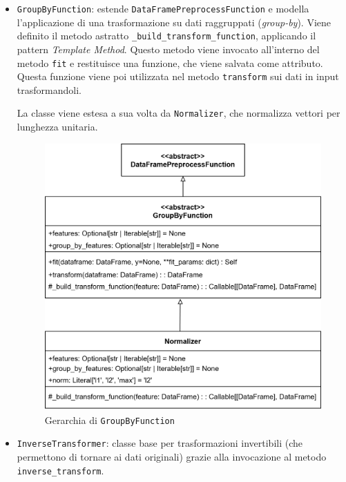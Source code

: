 \begin{itemize}
    \item \texttt{GroupByFunction}: estende \texttt{DataFramePreprocessFunction} e modella l'applicazione di una trasformazione su dati raggruppati (\textit{group-by}). Viene definito il metodo astratto \texttt{\_build\_transform\_function}, applicando il pattern \textit{Template Method}. Questo metodo viene invocato all'interno del metodo \texttt{fit} e restituisce una funzione, che viene salvata come attributo. Questa funzione viene poi utilizzata nel metodo \texttt{transform} sui dati in input trasformandoli.
    
    La classe viene estesa a sua volta da \texttt{Normalizer}, che normalizza vettori per lunghezza unitaria.

    \begin{figure}[H]
        \centering
        \includegraphics[scale=0.2]{figures/UML/preprocessing/group_by.png}
        \caption{Gerarchia di \texttt{GroupByFunction}}
    \end{figure}

    \item \texttt{InverseTransformer}: classe base per trasformazioni invertibili (che permettono di tornare ai dati originali) grazie alla invocazione al metodo \\ \texttt{inverse\_transform}.
    

\end{itemize}
